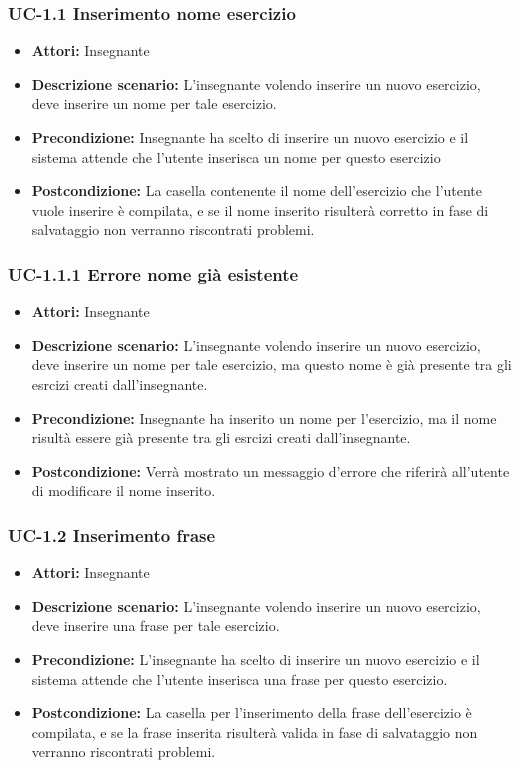 \subsubsection{UC-1.1 Inserimento nome esercizio}
\begin{itemize}
\item \textbf{Attori: }Insegnante
\item \textbf{Descrizione scenario: }L'insegnante volendo inserire un nuovo esercizio, deve inserire un nome per tale esercizio.
\item \textbf{Precondizione: }Insegnante ha scelto di inserire un nuovo esercizio e il sistema attende che l'utente inserisca un nome per questo esercizio
\item \textbf{Postcondizione: }La casella contenente il nome dell'esercizio che l'utente vuole inserire è compilata, e se il nome inserito risulterà corretto in fase di salvataggio non verranno riscontrati problemi.
\end{itemize}
\subsubsection{UC-1.1.1 Errore nome già esistente}
\begin{itemize}
\item \textbf{Attori: }Insegnante
\item \textbf{Descrizione scenario: }L'insegnante volendo inserire un nuovo esercizio, deve inserire un nome per tale esercizio, ma questo nome è già presente tra gli esrcizi creati dall'insegnante.
\item \textbf{Precondizione: }Insegnante ha inserito un nome per l'esercizio, ma il nome risultà essere già presente tra gli esrcizi creati dall'insegnante.
\item \textbf{Postcondizione: }Verrà mostrato un messaggio d'errore che riferirà all'utente di modificare il nome inserito.
\end{itemize}
\subsubsection{UC-1.2 Inserimento frase}
\begin{itemize}
\item \textbf{Attori: }Insegnante
\item \textbf{Descrizione scenario: }L'insegnante volendo inserire un nuovo esercizio, deve inserire una frase per tale esercizio.
\item \textbf{Precondizione: }L'insegnante ha scelto di inserire un nuovo esercizio e il sistema attende che l'utente inserisca una frase per questo esercizio.
\item \textbf{Postcondizione: }La casella per l'inserimento della frase dell'esercizio è compilata, e se la frase inserita risulterà valida in fase di salvataggio non verranno riscontrati problemi.
\end{itemize}
